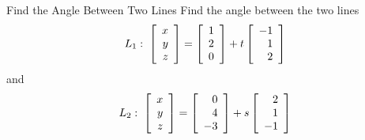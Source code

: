 \begin{example}{Find the Angle Between Two Lines}\label{exa:anglebetweentwolines}
Find the angle between the two lines
\begin{equation*}
L_1:  \;
\left[
\begin{array}{r}
x \\
y \\
z 
\end{array}
\right]
 = 
\left[
\begin{array}{r}
1 \\
2 \\
0
\end{array}
\right] +t\left[
\begin{array}{r}
-1 \\
1 \\
2
\end{array}
\right] 
\end{equation*}
 and
\begin{equation*}
L_2: \;
\left[
\begin{array}{r}
x \\
y \\
z
\end{array}
\right]
 = 
\left[
\begin{array}{r}
0 \\
4 \\
-3
\end{array}
\right]
 +s\left[
\begin{array}{r}
2 \\
1 \\
-1
\end{array}
\right]
\end{equation*}
\end{example}

